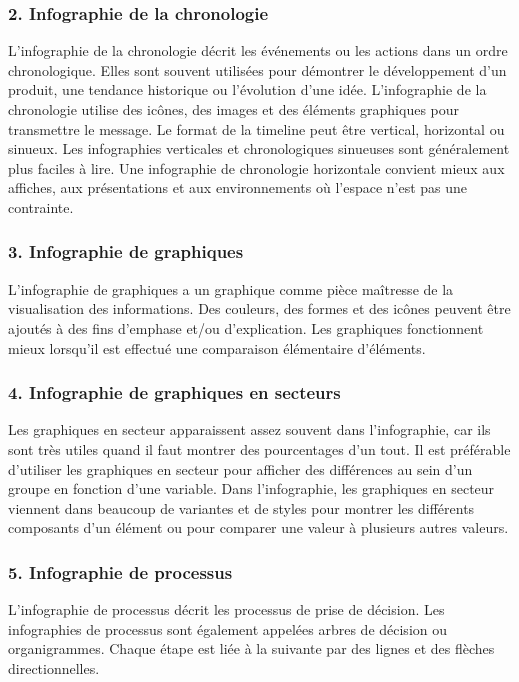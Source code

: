 \documentclass[french, a4paper, 12pt]{report}
\begin{document}
\subsubsection{2. Infographie de la chronologie }
L'infographie de la chronologie décrit les événements ou les actions dans un ordre chronologique. Elles sont souvent utilisées pour démontrer le développement d’un produit, une tendance historique ou l’évolution d’une idée. L'infographie de la chronologie utilise des icônes, des images et des éléments graphiques pour transmettre le message. Le format de la timeline peut être vertical, horizontal ou sinueux. Les infographies verticales et chronologiques sinueuses sont généralement plus faciles à lire. Une infographie de chronologie horizontale convient mieux aux affiches, aux présentations et aux environnements où l'espace n'est pas une contrainte.

\subsubsection{3. Infographie de graphiques }
L’infographie de graphiques a un graphique comme pièce maîtresse de la visualisation des informations. Des couleurs, des formes et des icônes peuvent être ajoutés à des fins d'emphase et/ou d'explication. Les graphiques fonctionnent mieux lorsqu’il est effectué une comparaison élémentaire d'éléments. 

\subsubsection{4. Infographie de graphiques en secteurs}
Les graphiques en secteur apparaissent assez souvent dans l'infographie, car ils sont très utiles quand il faut montrer des pourcentages d'un tout. Il est préférable d'utiliser les graphiques en secteur pour afficher des différences au sein d'un groupe en fonction d'une variable. Dans l'infographie, les graphiques en secteur viennent dans beaucoup de variantes et de styles pour montrer les différents composants d’un élément ou pour comparer une valeur à plusieurs autres valeurs.

\subsubsection{5. Infographie de processus }
L’infographie de processus décrit les processus de prise de décision. Les infographies de processus sont également appelées arbres de décision ou organigrammes. Chaque étape est liée à la suivante par des lignes et des flèches directionnelles. 
\end{document}

